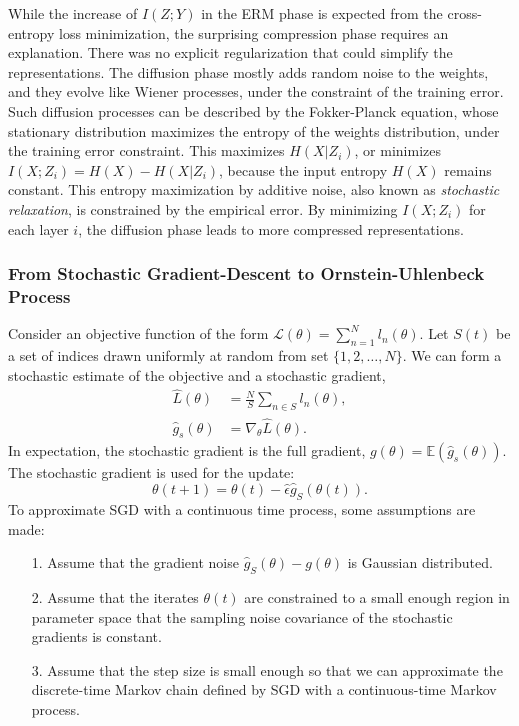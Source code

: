 \documentclass[11pt]{article}
\begin{document}
While the increase of $I(Z;Y)$ in the ERM phase is expected from the cross-entropy loss minimization, the surprising compression phase requires an explanation. There was no explicit regularization that could simplify the representations. The diffusion phase mostly adds random noise to the weights, and they evolve like Wiener processes, under the constraint of the training error. Such diffusion processes can be described by the Fokker-Planck equation, whose stationary distribution maximizes the entropy of the weights distribution, under the training error constraint. This maximizes $H(X\vert Z_i)$, or minimizes $I(X;Z_i) = H(X) - H(X\vert Z_i)$, because the input entropy $H(X)$ remains constant. This entropy maximization by additive noise, also known as \emph{stochastic relaxation}, is constrained by the empirical error. By minimizing $I(X;Z_i)$ for each layer $i$, the diffusion phase leads to more compressed representations.

\subsubsection*{From Stochastic Gradient-Descent to Ornstein-Uhlenbeck Process}

Consider an objective function of the form $\mathcal L(\theta) = \sum_{n=1}^N l_n(\theta)$. Let $S(t)$ be a set of indices drawn uniformly at random from set $\{1,2,\dots,N\}$. We can form a stochastic estimate of the objective and a stochastic gradient,
\begin{align}
\hat L(\theta) &= \frac{N}{S} \sum_{n\in S} l_n(\theta),\\
\hat g_s(\theta) &= \nabla_\theta  \hat L(\theta).
\end{align}
In expectation, the stochastic gradient is the full gradient, $g(\theta) = \mathbb E(\hat{g}_s(\theta) )$. The stochastic gradient is used for the update:
\begin{equation}
\theta(t+1) = \theta(t) - \hat\epsilon \hat g_S(\theta(t)).
\end{equation}
To approximate SGD with a continuous time process, some assumptions are made:
\begin{itemize}
\item[1.] Assume that the gradient noise $\hat g_S(\theta)-g(\theta) $ is Gaussian distributed.
\item[2.] Assume that the iterates $\theta(t)$ are constrained to a small enough region in parameter space that the sampling noise covariance of the stochastic gradients is constant.
\item[3.] Assume that the step size is small enough so that we can approximate the discrete-time Markov chain defined by SGD with a continuous-time Markov process.
\end{itemize}
\end{document}
